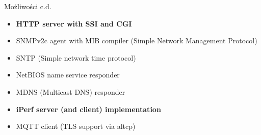     \begin{frame}{Możliwości c.d.}
        \begin{itemize}
            \item \textbf{HTTP server with SSI and CGI}
            \item SNMPv2c agent with MIB compiler (Simple Network Management Protocol)
            \item SNTP (Simple network time protocol)
            \item NetBIOS name service responder
            \item MDNS (Multicast DNS) responder
            \item \textbf{iPerf server (and client) implementation}
            \item MQTT client (TLS support via altcp)
        \end{itemize}
    \end{frame}
